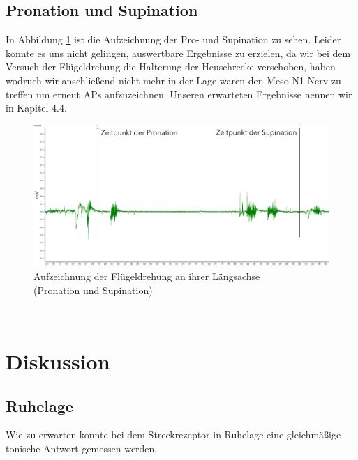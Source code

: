 \documentclass[a4paper]{article}
\begin{document}
\subsection{Pronation und Supination}
In Abbildung \ref{fig:A4} ist die Aufzeichnung der Pro- und Supination zu sehen. Leider konnte es uns nicht gelingen, auswertbare Ergebnisse zu erzielen, da wir bei dem Versuch der Flügeldrehung die Halterung der Heuschrecke verschoben, haben wodruch wir anschließend nicht mehr in der Lage waren den Meso N1 Nerv zu treffen um erneut APs aufzuzeichnen.
Unseren erwarteten Ergebnisse nennen wir in Kapitel 4.4.
\vspace{2.5\baselineskip} \\
\begin{figure}[H]
    \centering
    \includegraphics[scale=0.2]{images/A4_Messung.png}
    \caption{\label{fig:A4} Aufzeichnung der Flügeldrehung an ihrer Längsachse \\ (Pronation und Supination)}
\end{figure}
\vspace{2.5\baselineskip} \\


\newpage
\section{Diskussion}

\subsection{Ruhelage}
Wie zu erwarten konnte bei dem Streckrezeptor in Ruhelage eine gleichmäßige tonische Antwort gemessen werden.
\end{document}
